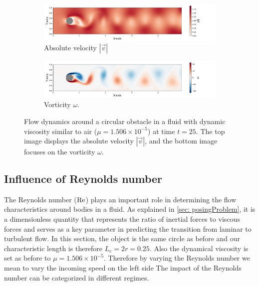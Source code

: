 \begin{figure}[!htb]
  \centering
  \hspace*{0.7cm}
  \begin{subfigure}[b]{\linewidth} %
    \includegraphics[width=\linewidth]{0_graphics/numeric/absV_25_sim.pdf}
    \caption{Absolute velocity $|\vec{v}|$}
    \label{fig:abs_velocity_25}
  \end{subfigure}
  \vspace{1em} %
  \hspace*{0.7cm}
  \begin{subfigure}[b]{\linewidth} %
    \includegraphics[width=\linewidth]{0_graphics/numeric/vor_25_sim.pdf} %
    \caption{Vorticity $\omega$.}
    \label{fig:vorticity_25}
  \end{subfigure}
  \vspace{-15pt}
  \caption{Flow dynamics around a circular obstacle in a fluid with dynamic viscosity similar to air ($\mu = 1.506 \times 10^{-5}$) at time $t=25$. The top image displays the absolute velocity $|\vec{v}|$, and the bottom image focuses on the vorticity $\omega$.}
  \label{fig:first_karman}
\end{figure}


\subsection{Influence of Reynolds number}
The Reynolds number ($\mathrm{Re}$) plays an important role in determining the flow characteristics around bodies in a fluid. As explained in \cref{sec: posingProblem}, it is a dimensionless quantity that represents the ratio of inertial forces to viscous forces and serves as a key parameter in predicting the transition from laminar to turbulent flow. In this section, the object is the same circle as before and our characteristic length is therefore $L_c = 2  r = 0.25$. Also the dynamical viscosity is set as before to $\mu = 1.506 \times 10^{-5}$. Therefore by varying the Reynolds number we mean to vary the incoming speed on the left side
The impact of the Reynolds number can be categorized in different regimes.



